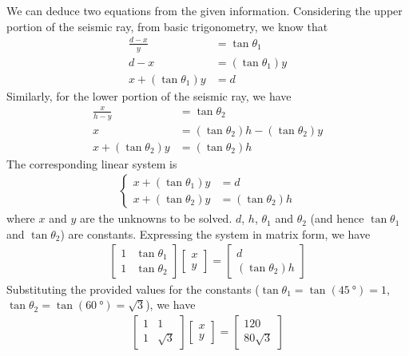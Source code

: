 \begin{solution}
We can deduce two equations from the given information. Considering the upper portion of the seismic ray, from basic trigonometry, we know that 
\begin{align*}
\frac{d-x}{y} &= \tan \theta_1 \\
d-x &= (\tan\theta_1) y \\
x + (\tan\theta_1) y &= d
\end{align*}
Similarly, for the lower portion of the seismic ray, we have
\begin{align*}
\frac{x}{h-y} &= \tan \theta_2 \\
x &= (\tan \theta_2) h - (\tan\theta_2) y \\
x + (\tan\theta_2) y &= (\tan \theta_2) h
\end{align*}
The corresponding linear system is
\begin{align}
\left\{\begin{alignedat}{2}
x + (\tan\theta_1) y &= d \\
x + (\tan\theta_2) y &= (\tan \theta_2) h
\end{alignedat}\right.
\end{align}
where $x$ and $y$ are the unknowns to be solved. $d$, $h$, $\theta_1$ and $\theta_2$ (and hence $\tan\theta_1$ and $\tan\theta_2$) are constants. Expressing the system in matrix form, we have
\begin{align*}
\begin{bmatrix}
1 & \tan\theta_1 \\
1 & \tan\theta_2
\end{bmatrix}
\begin{bmatrix}
x \\
y
\end{bmatrix}
=
\begin{bmatrix}
d \\
(\tan \theta_2) h
\end{bmatrix}
\end{align*}
Substituting the provided values for the constants ($\tan\theta_1 = \tan(\SI{45}{\degree}) = 1$, $\tan\theta_2 = \tan(\SI{60}{\degree}) = \sqrt{3}$), we have
\begin{align*}
\begin{bmatrix}
1 & 1 \\
1 & \sqrt{3}
\end{bmatrix}
\begin{bmatrix}
x \\
y
\end{bmatrix}
=
\begin{bmatrix}
120 \\
80\sqrt{3}
\end{bmatrix}
\end{align*}
\end{solution}

